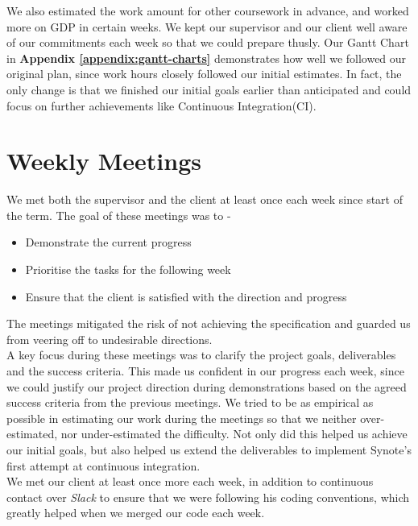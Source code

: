 We also estimated the work amount for other coursework in advance, and worked more on GDP in certain weeks. We kept our supervisor and our client well aware of our commitments each week so that we could prepare thusly. Our Gantt Chart in \textbf{Appendix \ref{appendix:gantt-charts}} demonstrates how well we followed our original plan, since work hours closely followed our initial estimates. In fact, the only change is that we finished our initial goals earlier than anticipated and could focus on further achievements like Continuous Integration(CI).

\section{Weekly Meetings}
\label{sec:weekly-meetings}
We met both the supervisor and the client at least once each week since start of the term. The goal of these meetings was to -

\begin{itemize}

  \item Demonstrate the current progress
  \item Prioritise the tasks for the following week
  \item Ensure that the client is satisfied with the direction and progress

\end{itemize}

The meetings mitigated the risk of not achieving the specification and guarded us from veering off to undesirable directions.\\

A key focus during these meetings was to clarify the project goals, deliverables and the success criteria. This made us confident in our progress each week, since we could justify our project direction during demonstrations based on the agreed success criteria from the previous meetings. We tried to be as empirical as possible in estimating our work during the meetings so that we neither over-estimated, nor under-estimated the difficulty. Not only did this helped us achieve our initial goals, but also helped us extend the deliverables to implement Synote's first attempt at continuous integration. \\

We met our client at least once more each week, in addition to continuous contact over \textit{Slack} to ensure that we were following his coding conventions, which greatly helped when we merged our code each week.

